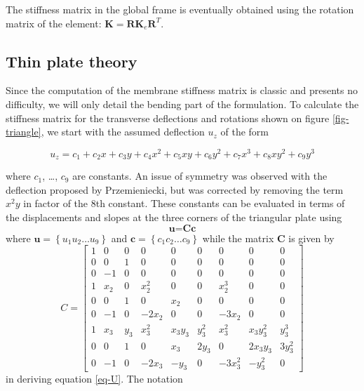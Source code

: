 \documentclass{llncs}
\begin{document}
The stiffness matrix in the global frame is eventually obtained using the rotation matrix of the element: $\textbf{K} = \textbf{R} \textbf{K}_e \textbf{R}^{T}$.

\subsection{Thin plate theory}

Since the computation of the membrane stiffness matrix is classic and presents no difficulty, we will only detail the bending part of the formulation. To calculate the stiffness matrix for the transverse deflections and rotations shown on figure \ref{fig-triangle}, we start with the assumed deflection $u_z$ of the form

\begin{equation}
 u_z = c_1 + c_2x + c_3y + c_4x^2 + c_5xy + c_6y^2 + c_7x^3 + c_8xy^2 + c_9y^3
\label{eq-deflection}
\end{equation} 

where $c_1$, \ldots , $c_9$ are constants. An issue of symmetry was observed with the deflection proposed by Przemieniecki, but was corrected by removing the term $x^2y$ in factor of the 8th constant. These constants can be evaluated in terms of the displacements and slopes at the three corners of the triangular plate using 
\begin{equation}
\textbf{u} = \textbf{Cc}
\label{eq-U}
\end{equation} 
where $\textbf{u} = \left\{u_1 u_2 \ldots u_9 \right\} $ and $\textbf{c} = \left\{c_1 c_2 \ldots c_9 \right\} $ while the matrix $\textbf{C}$ is given by
\begin{equation}
C = 
	\begin{bmatrix}
	1 & 0 & 0 & 0 & 0 & 0 & 0 & 0 & 0 \\
 	0 & 0 & 1 & 0 & 0 & 0 & 0 & 0 & 0 \\
	0 & -1 & 0 & 0 & 0 & 0 & 0 & 0 & 0 \\
	1 & x_2 & 0 & x_2^2 & 0 & 0 & x_2^3 & 0 & 0 \\
	0 & 0 & 1 & 0 & x_2 & 0 & 0 & 0 & 0 \\
	0 & -1 & 0 & -2x_2 & 0 & 0 & -3x_2 & 0 & 0 \\
	1 & x_3 & y_3 & x_3^2 & x_3y_3 & y_3^2 & x_3^2 & x_3y_3^2& y_3^3 \\
	0 & 0 & 1 & 0 & x_3 & 2y_3 & 0 & 2x_3y_3 & 3y_3^2 \\
	0 & -1 & 0 & -2x_3 & -y_3 & 0 & -3x_3^2 & -y_3^2 & 0
	\end{bmatrix}
\end{equation} 
in deriving equation \ref{eq-U}. The notation 
\end{document}

